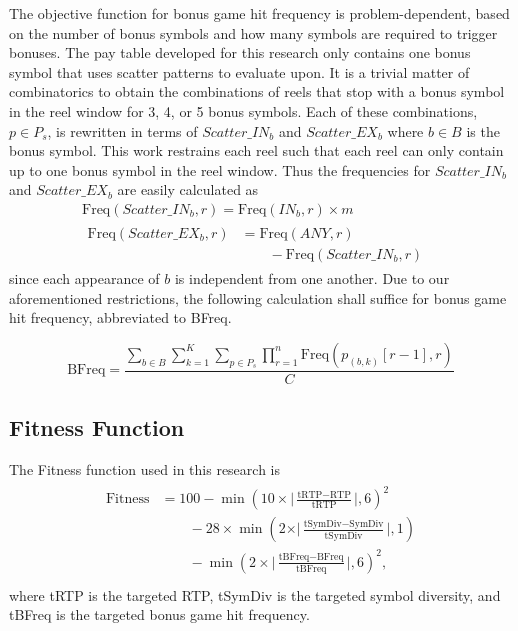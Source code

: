 \documentclass[conference]{IEEEtran}
\begin{document}
\par
The objective function for bonus game hit frequency is problem-dependent, based on the number of bonus symbols and how many symbols are required to trigger bonuses.
The pay table developed for this research only contains one bonus symbol that uses scatter patterns to evaluate upon.
It is a trivial matter of combinatorics to obtain the combinations of reels that stop with a bonus symbol in the reel window for 3, 4, or 5 bonus symbols.
Each of these combinations, $p \in P_s$, is rewritten in terms of $Scatter\_{IN}_b$ and $Scatter\_{EX}_b$ where $b\in B$ is the bonus symbol.
This work restrains each reel such that each reel can only contain up to one bonus symbol in the reel window.
Thus the frequencies for $Scatter\_{IN}_b$ and $Scatter\_{EX}_b$ are easily calculated as
\begin{align}
		\text{Freq}(Scatter\_{IN}_b,r) = \text{Freq}(IN_b,r) \times m \text{ }\text{ }\text{ }\text{ }\text{ }\text{ }\text{ }\text{ }& \\
   \begin{aligned}
      \text{Freq}(Scatter\_{EX}_b,r) &= \text{Freq}(ANY,r)\\
      &\text{ }\text{ }\text{ }- \text{Freq}(Scatter\_{IN}_b,r)
   \end{aligned}
\end{align}
since each appearance of $b$ is independent from one another.
Due to our aforementioned restrictions, the following calculation shall suffice for bonus game hit frequency, abbreviated to BFreq.

\begin{equation}
\text{BFreq} = \frac{\sum_{b \in B}\sum_{k=1}^{K}\sum_{p \in P_s}\prod_{r=1}^{n}\text{Freq}(p_{(b,k)}[r-1],r)}{C}
\end{equation}
\subsection{Fitness Function}
The Fitness function used in this research is 
\begin{align}
   \begin{aligned}
      \text{Fitness}&= 100 - \min(10\times \bigl| \frac{\text{tRTP} - \text{RTP}}{\text{tRTP}}\bigr|, 6)^2\\
      &\text{ }\text{ }\text{ }- 28\times\min(2\times \vert \frac{\text{tSymDiv} - \text{SymDiv}}{\text{tSymDiv}} \vert, 1) \\
      &\text{ }\text{ }\text{ }- \min(2\times \bigl| \frac{\text{tBFreq} - \text{BFreq}}{\text{tBFreq}} \bigr|, 6)^2, \\
   \end{aligned}
\label{fitness}
\end{align}
where tRTP is the targeted RTP, tSymDiv is the targeted symbol diversity, and tBFreq is the targeted bonus game hit frequency.
\end{document}
